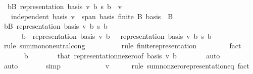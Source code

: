 \begin{isabellebody}
\ \ {\isachardoublequoteopen}{\isacharparenleft}{\kern0pt}{\isasymSum}b{\isasymin}B{\isachardot}{\kern0pt}\ representation\ basis\ v\ b\ {\isacharasterisk}{\kern0pt}s\ b{\isacharparenright}{\kern0pt}\ {\isacharequal}{\kern0pt}\ v{\isachardoublequoteclose}\isanewline
\ \ \ {\isachardoublequoteopen}independent\ basis{\isachardoublequoteclose}\ {\isachardoublequoteopen}v\ {\isasymin}\ span\ basis{\isachardoublequoteclose}\ {\isachardoublequoteopen}finite\ B{\isachardoublequoteclose}\ {\isachardoublequoteopen}basis\ {\isasymsubseteq}\ B{\isachardoublequoteclose}\isanewline
%
\isadelimproof
%
\endisadelimproof
%
\isatagproof
{}\isamarkupfalse%
\ {\isacharminus}{\kern0pt}\isanewline
\ \ \isamarkupfalse%
\ {\isachardoublequoteopen}{\isacharparenleft}{\kern0pt}{\isasymSum}b{\isasymin}B{\isachardot}{\kern0pt}\ representation\ basis\ v\ b\ {\isacharasterisk}{\kern0pt}s\ b{\isacharparenright}{\kern0pt}\ {\isacharequal}{\kern0pt}\isanewline
\ \ \ \ \ \ {\isacharparenleft}{\kern0pt}{\isasymSum}b\ {\isacharbar}{\kern0pt}\ representation\ basis\ v\ b\ {\isasymnoteq}\ {}{\isachardot}{\kern0pt}\ representation\ basis\ v\ b\ {\isacharasterisk}{\kern0pt}s\ b{\isacharparenright}{\kern0pt}{\isachardoublequoteclose}\isanewline
\ \ \ \ \isamarkupfalse%
\ {\isacharparenleft}{\kern0pt}rule\ sum{\isachardot}{\kern0pt}mono{\isacharunderscore}{\kern0pt}neutral{\isacharunderscore}{\kern0pt}cong{\isacharparenright}{\kern0pt}\isanewline
\ \ \ \ \ \ \ \ \isamarkupfalse%
\ {\isacharparenleft}{\kern0pt}rule\ finite{\isacharunderscore}{\kern0pt}representation{\isacharparenright}{\kern0pt}\isanewline
\ \ \ \ \ \ \ \isamarkupfalse%
\ fact\isanewline
\ \ \ \ \isamarkupfalse%
\ \ b\isanewline
\ \ \ \ \ \ \isamarkupfalse%
\ that\ representation{\isacharunderscore}{\kern0pt}ne{\isacharunderscore}{\kern0pt}zero{\isacharbrackleft}{\kern0pt}of\ basis\ v\ b{\isacharbrackright}{\kern0pt}\isanewline
\ \ \ \ \ \ \isamarkupfalse%
\ auto\isanewline
\ \ \ \ \isamarkupfalse%
\ \isamarkupfalse%
\ auto\isanewline
\ \ \ \ \isamarkupfalse%
\ \isamarkupfalse%
\ simp\isanewline
\ \ \ \ \isamarkupfalse%
\isanewline
\ \ \isamarkupfalse%
\ \isamarkupfalse%
\ {\isachardoublequoteopen}{\isasymdots}\ {\isacharequal}{\kern0pt}\ v{\isachardoublequoteclose}\isanewline
\ \ \ \ \isamarkupfalse%
\ {\isacharparenleft}{\kern0pt}rule\ sum{\isacharunderscore}{\kern0pt}nonzero{\isacharunderscore}{\kern0pt}representation{\isacharunderscore}{\kern0pt}eq{\isacharsemicolon}{\kern0pt}\ fact{\isacharparenright}{\kern0pt}\isanewline

\end{isabellebody}
